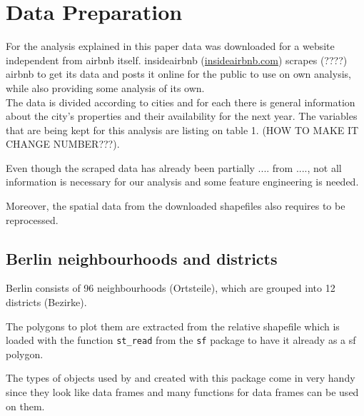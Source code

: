 \section{Data Preparation}\label{Sec:Data Preparation}

For the analysis explained in this paper data was downloaded for a website independent from airbnb itself. insideairbnb (\href{http://insideairbnb.com/}{insideairbnb.com}) scrapes (????) airbnb to get its data and posts it online for the public to use on own analysis, while also providing some analysis of its own.
\\
The data is divided according to cities and for each there is general information about the city's properties and their availability for the next year. The variables that are being kept for this analysis are listing on table 1. (HOW TO MAKE IT CHANGE NUMBER???).

Even though the scraped data has already been partially .... from ...., not all information is necessary for our analysis and some feature engineering is needed.

Moreover, the spatial data from the downloaded shapefiles also requires to be reprocessed.

\subsection{Berlin neighbourhoods and districts}


Berlin consists of 96 neighbourhoods (Ortsteile), which are grouped into 12 districts (Bezirke).

The polygons to plot them are extracted from the relative shapefile which is loaded with the function \texttt{st\_read} from the \texttt{sf} package to have it already as a sf polygon. 



The types of objects used by and created with this package come in very handy since they look like data frames and many functions for data frames can be used on them. 

